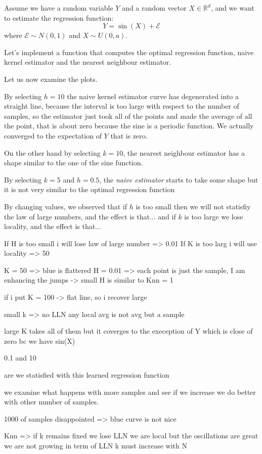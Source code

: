 Assume we have a random variable $Y$ and a random vector $X \in \mathbb{R}^d$, and we want to estimate the regression function:
\[
    Y = \sin(X) + \mathcal{E}
\]
where $\mathcal{E} \sim N(0,1)$ and $X \sim U(0,a)$.

Let's implement a function that computes the optimal regression function, naive kernel estimator and the nearest neighbour estimator.

Let us now examine the plots.

By selecting $h = 10$ the naive kernel estimator curve has degenerated into a straight line, because the interval is too large with respect to the number of samples, so the estimator just took all of the points and made the average of all the point, that is about zero because the sine is a periodic function. We actually converged to the expectation of $Y$ that is zero.

On the other hand by selecting $k=10$, the nearest neighbour estimator has a shape similar to the one of the sine function.

By selecting $k = 5$ and $h=0.5$, the \textit{naive estimator} starts to take some shape but it is not very similar to the optimal regression function

By changing values, we observed that if $h$ is too small then we will not statisfiy the law of large numbers, and the effect is that...
and if $k$ is too large we lose locality, and the effect is that...

If H is too small i will lose law of large number => 0.01
If K is too larg i will use locality => 50

K = 50 => blue is flattered
H = 0.01 => each point is just the sample, I am enhancing the jumps
-> small H is similar to Knn = 1

if i put K = 100 -> flat line, so i recover large

small k => no LLN
any local avg is not avg but a sample

large K takes all of them but it coverges to the exeception of Y which is close of zero bc we have sin(X)

0.1 and 10

are we statisfied with this learned regression function

we examine what happens with more samples and see if we increase we do better with other number of samples.

1000 of samples
disappointed => blue curve is not nice

Knn =>
if k remains fixed we lose LLN
we are local but the oscillations are great
we are not growing in term of LLN
k must increase with N

